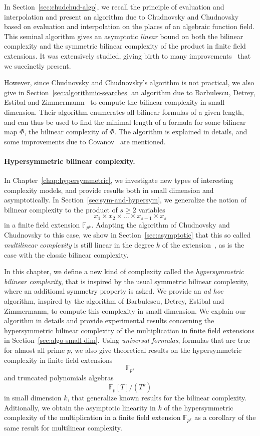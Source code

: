 In Section~\ref{sec:chudchud-algo}, we recall the principle of evaluation and
interpolation and present an algorithm due to Chudnovsky and
Chudnovsky~\cite{CC88} based on evaluation and interpolation on the places of an
algebraic function field. This seminal algorithm gives an asymptotic
\emph{linear} bound on
both the bilinear complexity and the symmetric bilinear complexity of the
product in finite field extensions. It was extensively studied, giving birth to
many improvements~\cite{BR04, CO10, Randriam12} that we succinctly present.

However, since Chudnovsky and Chudnovsky's algorithm is not practical, we also
give in Section~\ref{sec:algorithmic-searches} an algorithm due to Barbulescu,
Detrey, Estibal and Zimmermanm~\cite{BDEZ12} to compute the bilinear complexity
in small dimension. Their algorithm enumerates all bilinear formulas of a given
length, and can thus be used to find the minimal length of a formula for some
bilinear map $\Phi$, \ie the bilinear complexity of $\Phi$. The
algorithm is explained in details, and some improvements due to
Covanov~\cite{Covanov19} are mentioned.

\paragraph{Hypersymmetric bilinear complexity.}
In Chapter~\ref{chap:hypersymmetric}, we investigate new types of interesting
complexity models, and provide results both in small dimension and
asymptotically. In Section~\ref{sec:sym-and-hypersym}, we generalize the notion
of bilinear complexity to the product of $s\geq2$ variables
\[
  x_1\times x_2\times\dots\times x_{s-1}\times x_s
\]
in a finite field extension $\mathbb{F}_{p^k}$. Adapting the algorithm of
Chudnovsky and Chudnovsky to this case, we show in Section~\ref{sec:asymptotic}
that this so called \emph{multilinear complexity} is still linear in the degree
$k$ of the extension~\cite{RR21}, as is the case with the classic bilinear
complexity.

In this chapter, we define a new kind of complexity called the
\emph{hypersymmetric bilinear complexity}, that is inspired by the usual
symmetric bilinear complexity, where an additional symmetry property is asked.
We provide an \emph{ad hoc} algorithm, inspired by the algorithm of Barbulescu,
Detrey, Estibal and Zimmermanm, to compute this complexity in small dimension.
We explain our algorithm in details and provide experimental results concerning
the hypersymmetric bilinear complexity of the multiplication in finite field
extensions in Section~\ref{sec:algo-small-dim}. Using \emph{universal formulas},
\ie formulas that are true for almost all prime $p$, we also give theoretical
results on the hypersymmetric complexity in finite field extensions
\[
  \mathbb{F}_{p^{k}}
\]
and truncated polynomials algebras
\[
  \mathbb{F}_p[T]/(T^k)
\]
in small dimension $k$, that generalize known results for the bilinear
complexity. Aditionally, we obtain the asymptotic linearity in $k$ of the
hypersymmetric complexity of the multiplication in a finite field extension
$\mathbb{F}_{p^k}$ as a corollary of the same result for multilinear
complexity.

